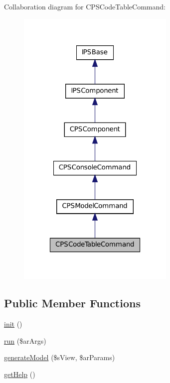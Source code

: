 Collaboration diagram for CPSCodeTableCommand:\nopagebreak
\begin{figure}[H]
\begin{center}
\leavevmode
\includegraphics[width=214pt]{classCPSCodeTableCommand__coll__graph}
\end{center}
\end{figure}
\subsection*{Public Member Functions}
\begin{DoxyCompactItemize}
\item 
\hyperlink{classCPSCodeTableCommand_a4be4055f3361d4800e16bc2e2e38cda6}{init} ()
\item 
\hyperlink{classCPSCodeTableCommand_a330e31e8c3572ce01a4e1c8485c6aedd}{run} (\$arArgs)
\item 
\hyperlink{classCPSCodeTableCommand_afae31a43a5d0c7b44333eba3cc20f70e}{generateModel} (\$sView, \$arParams)
\item 
\hyperlink{classCPSCodeTableCommand_a4cc928ef4def3a84c181608d31bf7608}{getHelp} ()
\end{DoxyCompactItemize}
